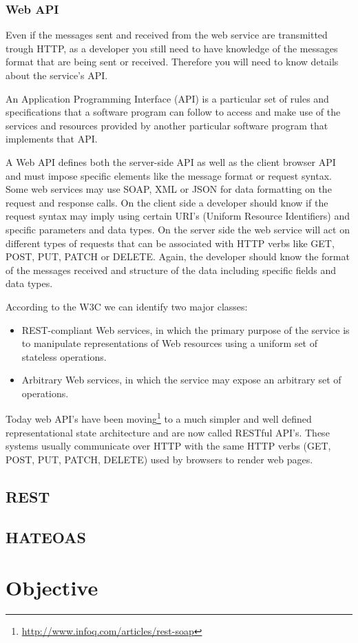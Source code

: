 \subsubsection{Web API}
\label{sub-sub-sec:web-api}

Even if the messages sent and received from the web service are transmitted trough HTTP, as a developer you still need to have knowledge of the messages format that are being sent or received. Therefore you will need to know details about the service's API.

An Application Programming Interface (API) is a particular
set of rules and specifications that a software program can follow to access and make use of the services
and resources provided by another particular software program that implements that API.

A Web API defines both the server-side API as well as the client browser API and must impose specific elements like the message format or request syntax. Some web services may use SOAP, XML or JSON for data formatting on the request and response calls. On the client side a developer should know if the request syntax may imply using certain URI's (Uniform Resource Identifiers) and specific parameters and data types. On the server side the web service will act on different types of requests that can be associated with HTTP verbs like GET, POST, PUT, PATCH or DELETE. Again, the developer should know the format of the messages received and structure of the data including specific fields and data types.

According to the W3C \cite{W3C} we can identify two major classes:
\begin{itemize}
\item REST-compliant Web services, in which the primary purpose of the service is to manipulate representations of Web resources using a uniform set of stateless operations.
\item Arbitrary Web services, in which the service may expose an arbitrary set of operations. 
\end{itemize}

Today web API's have been moving\footnote{\url{http://www.infoq.com/articles/rest-soap}} to a much simpler and well defined representational state architecture and are now called RESTful API's. These systems usually communicate over HTTP with the same HTTP verbs (GET, POST, PUT, PATCH, DELETE) used by browsers to render web pages.

\subsection{REST}
\label{sub-sec:rest}



\subsection{HATEOAS}
\label{sub-sec:hateoas}



\section{Objective}
\label{sec:objective}

